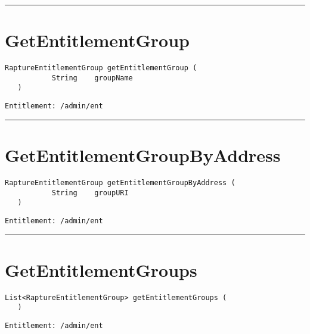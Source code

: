 \rule{12cm}{2pt}
\section{GetEntitlementGroup}
\label{Api:GetEntitlementGroup}
\begin{lstlisting}[style=nonumbers]
   RaptureEntitlementGroup getEntitlementGroup (
           String    groupName
   )
\end{lstlisting}
\begin{Verbatim}[formatcom=\color{Maroon}]
  Entitlement: /admin/ent
\end{Verbatim}



\rule{12cm}{2pt}
\section{GetEntitlementGroupByAddress}
\label{Api:GetEntitlementGroupByAddress}
\begin{lstlisting}[style=nonumbers]
   RaptureEntitlementGroup getEntitlementGroupByAddress (
           String    groupURI
   )
\end{lstlisting}
\begin{Verbatim}[formatcom=\color{Maroon}]
  Entitlement: /admin/ent
\end{Verbatim}



\rule{12cm}{2pt}
\section{GetEntitlementGroups}
\label{Api:GetEntitlementGroups}
\begin{lstlisting}[style=nonumbers]
   List<RaptureEntitlementGroup> getEntitlementGroups (
   )
\end{lstlisting}
\begin{Verbatim}[formatcom=\color{Maroon}]
  Entitlement: /admin/ent
\end{Verbatim}



